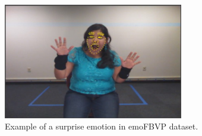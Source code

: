 \begin{figure}[!htb]	\includegraphics[width=0.7\textwidth]{images/emoFBVP.png} 
    \centering

\caption{
Example of a surprise emotion in emoFBVP dataset.
} 

\label{fig:emoFBVP}
\end{figure}